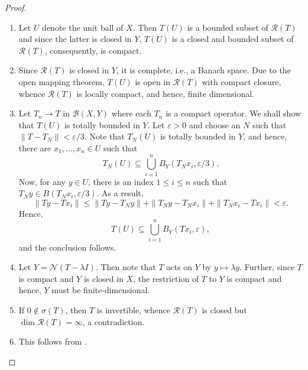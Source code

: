 \documentclass[12pt]{article}
\theoremstyle{thmstyle}
\theoremstyle{defstyle}
\newcommand{\scrB}{\mathscr B}
\newcommand{\scrN}{\mathscr N}
\newcommand{\scrR}{\mathscr R}
\renewcommand{\le}{\leqslant}
\begin{document}
\begin{proof}
\begin{enumerate}[label=(\alph*)]
    \item Let $U$ denote the unit ball of $X$. Then $T(U)$ is a bounded subset of $\scrR(T)$ and since the latter is closed in $Y$, $\overline{T(U)}$ is a closed and bounded subset of $\scrR(T)$, consequently, is compact.
    \item Since $\scrR(T)$ is closed in $Y$, it is complete, i.e., a Banach space. Due to the open mapping theorem, $T(U)$ is open in $\scrR(T)$ with compact closure, whence $\scrR(T)$ is locally compact, and hence, finite dimensional.
    \item Let $T_n\to T$ in $\scrB(X, Y)$ where each $T_n$ is a compact operator. We shall show that $T(U)$ is totally bounded in $Y$. Let $\varepsilon > 0$ and choose an $N$ such that $\|T - T_N\| < \varepsilon/3$. Note that $T_N(U)$ is totally bounded in $Y$, and hence, there are $x_1,\dots,x_n\in U$ such that 
    \begin{equation*}
        T_N(U)\subseteq\bigcup_{i = 1}^n B_Y(T_Nx_i, \varepsilon/3).
    \end{equation*}
    Now, for any $y\in U$, there is an index $1\le i\le n$ such that $T_Ny\in B(T_Nx_i, \varepsilon/3)$. As a result, 
    \begin{equation*}
        \|Ty - Tx_i\|\le\|Ty - T_Ny\| + \|T_Ny - T_Nx_i\| + \|T_Nx_i - Tx_i\| < \varepsilon.
    \end{equation*}
    Hence, 
    \begin{equation*}
        T(U)\subseteq\bigcup_{i = 1}^n B_Y(Tx_i, \varepsilon),
    \end{equation*}
    and the conclusion follows.

    \item Let $Y = \scrN(T - \lambda I)$. Then note that $T$ acts on $Y$ by $y\mapsto\lambda y$. Further, since $T$ is compact and $Y$ is closed in $X$, the restriction of $T$ to $Y$ is compact and hence, $Y$ must be finite-dimensional. 
    \item If $0\notin\sigma(T)$, then $T$ is invertible, whence $\scrR(T)$ is closed but $\dim\scrR(T) = \infty$, a contradiction. 
    \item This follows from .\qedhere
\end{enumerate}
\end{proof}
\end{document}

